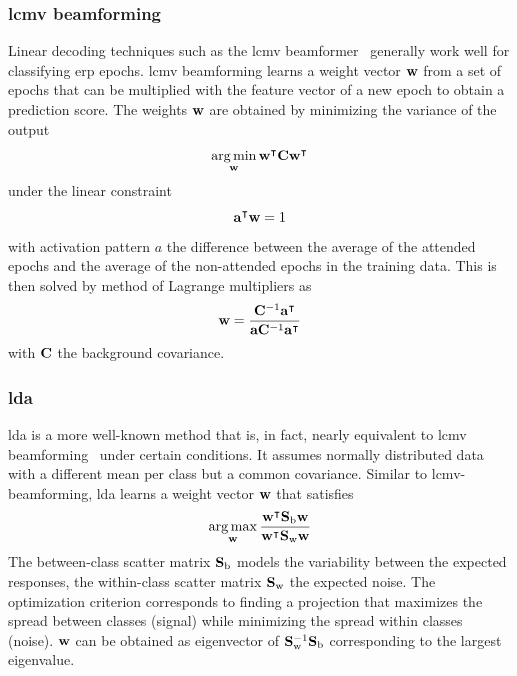 \subsubsection{\Acf{lcmv} beamforming}
Linear decoding techniques such as the \ac{lcmv}
beamformer~\cite{Wittevrongel2016} generally work well for
classifying \ac{erp} epochs.
\Ac{lcmv} beamforming learns a weight vector $\mathbf{w}$ from a set of epochs that can
be multiplied with the feature vector of a new epoch to obtain a prediction
score.
The weights $\mathbf{w}$ are obtained by minimizing the variance of the output
\begin{equation}
  \operatorname*{arg\,min}_{\mathbf{w}}\mathbf{w}^\intercal\mathbf{C}
	\mathbf{w}^\intercal
\end{equation}
under the linear constraint
\begin{equation}
	\mathbf{a}^\intercal\mathbf{w} = 1
\end{equation}
with activation pattern $a$ the difference between the average of the attended epochs and the
average of the non-attended epochs in the training data.
This is then solved by  method of Lagrange multipliers as
\begin{equation}
	\mathbf{w} =
  \frac{\mathbf{C}^{-1}\mathbf{a}^\intercal}
  {\mathbf{a}\mathbf{C}^{-1}\mathbf{a}^\intercal}
\end{equation}
with $\mathbf{C}$ the background covariance.

\subsubsection{\Acf{lda}}
\Ac{lda} is a more well-known method that is, in fact, nearly equivalent to
\ac{lcmv} beamforming~\cite{Treder2016} under certain conditions.
It assumes normally distributed data with a different mean per class but a
common covariance.
Similar to \ac{lcmv}-beamforming, \ac{lda} learns a weight vector $\mathbf{w}$
that satisfies
\begin{equation}
  \operatorname*{arg\,max}_{\mathbf{w}}\frac{\mathbf{w}^\intercal\mathbf{S}_\text{b}\mathbf{w}}{\mathbf{w}^\intercal\mathbf{S}_\text{w}\mathbf{w}}
\end{equation}
The between-class scatter matrix $\mathbf{S}_\text{b}$ models the variability
between the expected responses, the within-class scatter matrix
$\mathbf{S}_\text{w}$ the expected noise.
The optimization criterion corresponds to finding a projection that maximizes
the spread between classes (signal) while minimizing the spread within classes
(noise).
$\mathbf{w}$ can be obtained as eigenvector of
$\mathbf{S}_\text{w}^{-1}\mathbf{S}_\text{b}$ corresponding to the largest eigenvalue.

